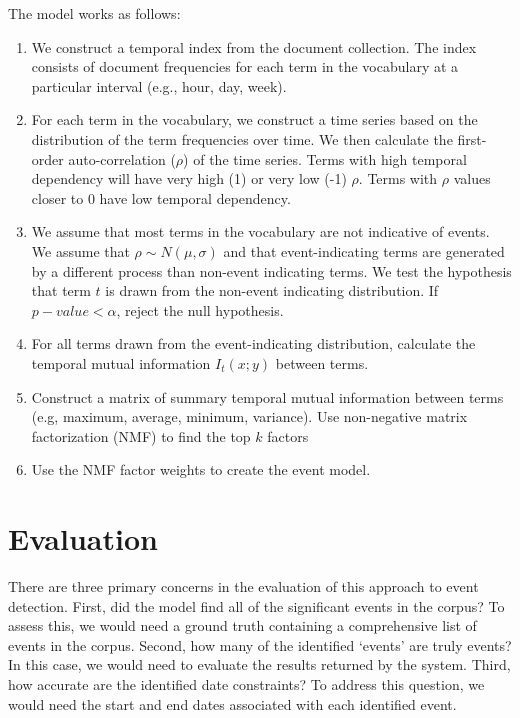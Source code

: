 \documentclass{sig-alternate}
\begin{document}
The model works as follows:
\begin{enumerate}
\item We construct a temporal index from the document collection. The index consists of document frequencies for each term in the vocabulary at a particular interval (e.g., hour, day, week).
\item For each term in the vocabulary, we construct a time series based on the distribution of the term frequencies over time. We then calculate the first-order auto-correlation ($\rho$) of the time series. Terms with high temporal dependency will have very high (1) or very low (-1) $\rho$.  Terms with $\rho$ values closer to 0 have low temporal dependency. 
\item We assume that most terms in the vocabulary are not indicative of events. We assume that $\rho \sim N(\mu, \sigma)$ and that event-indicating terms are generated by a different process than non-event indicating terms.  We test the hypothesis that term $t$ is drawn from the non-event indicating distribution.  If $p-value < \alpha$, reject the null hypothesis.
\item For all terms drawn from the event-indicating distribution, calculate the temporal mutual information $I_t(x;y)$ between terms.
\item Construct a matrix of summary temporal mutual information between terms (e.g, maximum, average, minimum, variance). Use non-negative matrix factorization (NMF) to find the top $k$ factors
\item Use the NMF factor weights to create the event model.
\end{enumerate}

\section{Evaluation}

There are three primary concerns in the evaluation of this approach to event detection.  First, did the model find all of the significant events in the corpus? To assess this, we would need a ground truth containing a comprehensive list of events in the corpus. Second, how many of the identified `events' are truly events? In this case, we would need to evaluate the results returned by the system.  Third, how accurate are the identified date constraints? To address this question, we would need the start and end dates associated with each identified event. 
\end{document}

